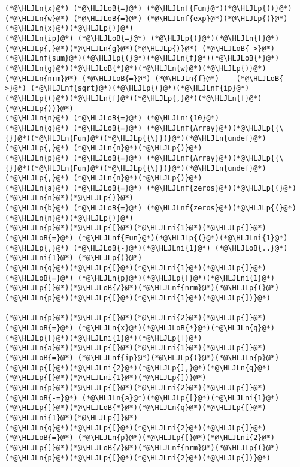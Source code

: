 \documentclass[12pt,landscape]{article}
\newcommand{\HLJLn}[1]{#1}
\newcommand{\HLJLnf}[1]{\textcolor[RGB]{66,102,213}{#1}}
\newcommand{\HLJLni}[1]{\textcolor[RGB]{59,151,46}{#1}}
\newcommand{\HLJLoB}[1]{\textcolor[RGB]{102,102,102}{\textbf{#1}}}
\newcommand{\HLJLp}[1]{#1}
\begin{document}
{\begin{lstlisting}
(*@\HLJLn{x}@*) (*@\HLJLoB{=}@*) (*@\HLJLnf{Fun}@*)(*@\HLJLp{()}@*)
(*@\HLJLn{w}@*) (*@\HLJLoB{=}@*) (*@\HLJLnf{exp}@*)(*@\HLJLp{(}@*)(*@\HLJLn{x}@*)(*@\HLJLp{)}@*)
(*@\HLJLn{ip}@*) (*@\HLJLoB{=}@*) (*@\HLJLp{(}@*)(*@\HLJLn{f}@*)(*@\HLJLp{,}@*)(*@\HLJLn{g}@*)(*@\HLJLp{)}@*) (*@\HLJLoB{->}@*) (*@\HLJLnf{sum}@*)(*@\HLJLp{(}@*)(*@\HLJLn{f}@*)(*@\HLJLoB{*}@*)(*@\HLJLn{g}@*)(*@\HLJLoB{*}@*)(*@\HLJLn{w}@*)(*@\HLJLp{)}@*)
(*@\HLJLn{nrm}@*) (*@\HLJLoB{=}@*) (*@\HLJLn{f}@*)    (*@\HLJLoB{->}@*) (*@\HLJLnf{sqrt}@*)(*@\HLJLp{(}@*)(*@\HLJLnf{ip}@*)(*@\HLJLp{(}@*)(*@\HLJLn{f}@*)(*@\HLJLp{,}@*)(*@\HLJLn{f}@*)(*@\HLJLp{))}@*)
(*@\HLJLn{n}@*) (*@\HLJLoB{=}@*) (*@\HLJLni{10}@*)
(*@\HLJLn{q}@*) (*@\HLJLoB{=}@*) (*@\HLJLnf{Array}@*)(*@\HLJLp{{\{}}@*)(*@\HLJLn{Fun}@*)(*@\HLJLp{{\}}(}@*)(*@\HLJLn{undef}@*)(*@\HLJLp{,}@*) (*@\HLJLn{n}@*)(*@\HLJLp{)}@*)
(*@\HLJLn{p}@*) (*@\HLJLoB{=}@*) (*@\HLJLnf{Array}@*)(*@\HLJLp{{\{}}@*)(*@\HLJLn{Fun}@*)(*@\HLJLp{{\}}(}@*)(*@\HLJLn{undef}@*)(*@\HLJLp{,}@*) (*@\HLJLn{n}@*)(*@\HLJLp{)}@*)
(*@\HLJLn{a}@*) (*@\HLJLoB{=}@*) (*@\HLJLnf{zeros}@*)(*@\HLJLp{(}@*)(*@\HLJLn{n}@*)(*@\HLJLp{)}@*)
(*@\HLJLn{b}@*) (*@\HLJLoB{=}@*) (*@\HLJLnf{zeros}@*)(*@\HLJLp{(}@*)(*@\HLJLn{n}@*)(*@\HLJLp{)}@*)
(*@\HLJLn{p}@*)(*@\HLJLp{[}@*)(*@\HLJLni{1}@*)(*@\HLJLp{]}@*) (*@\HLJLoB{=}@*) (*@\HLJLnf{Fun}@*)(*@\HLJLp{(}@*)(*@\HLJLni{1}@*)(*@\HLJLp{,}@*) (*@\HLJLoB{-}@*)(*@\HLJLni{1}@*) (*@\HLJLoB{..}@*) (*@\HLJLni{1}@*) (*@\HLJLp{)}@*)
(*@\HLJLn{q}@*)(*@\HLJLp{[}@*)(*@\HLJLni{1}@*)(*@\HLJLp{]}@*) (*@\HLJLoB{=}@*) (*@\HLJLn{p}@*)(*@\HLJLp{[}@*)(*@\HLJLni{1}@*)(*@\HLJLp{]}@*)(*@\HLJLoB{/}@*)(*@\HLJLnf{nrm}@*)(*@\HLJLp{(}@*)(*@\HLJLn{p}@*)(*@\HLJLp{[}@*)(*@\HLJLni{1}@*)(*@\HLJLp{])}@*)

(*@\HLJLn{p}@*)(*@\HLJLp{[}@*)(*@\HLJLni{2}@*)(*@\HLJLp{]}@*) (*@\HLJLoB{=}@*) (*@\HLJLn{x}@*)(*@\HLJLoB{*}@*)(*@\HLJLn{q}@*)(*@\HLJLp{[}@*)(*@\HLJLni{1}@*)(*@\HLJLp{]}@*)
(*@\HLJLn{a}@*)(*@\HLJLp{[}@*)(*@\HLJLni{1}@*)(*@\HLJLp{]}@*) (*@\HLJLoB{=}@*) (*@\HLJLnf{ip}@*)(*@\HLJLp{(}@*)(*@\HLJLn{p}@*)(*@\HLJLp{[}@*)(*@\HLJLni{2}@*)(*@\HLJLp{],}@*)(*@\HLJLn{q}@*)(*@\HLJLp{[}@*)(*@\HLJLni{1}@*)(*@\HLJLp{])}@*)
(*@\HLJLn{p}@*)(*@\HLJLp{[}@*)(*@\HLJLni{2}@*)(*@\HLJLp{]}@*) (*@\HLJLoB{-=}@*) (*@\HLJLn{a}@*)(*@\HLJLp{[}@*)(*@\HLJLni{1}@*)(*@\HLJLp{]}@*)(*@\HLJLoB{*}@*)(*@\HLJLn{q}@*)(*@\HLJLp{[}@*)(*@\HLJLni{1}@*)(*@\HLJLp{]}@*)
(*@\HLJLn{q}@*)(*@\HLJLp{[}@*)(*@\HLJLni{2}@*)(*@\HLJLp{]}@*) (*@\HLJLoB{=}@*) (*@\HLJLn{p}@*)(*@\HLJLp{[}@*)(*@\HLJLni{2}@*)(*@\HLJLp{]}@*)(*@\HLJLoB{/}@*)(*@\HLJLnf{nrm}@*)(*@\HLJLp{(}@*)(*@\HLJLn{p}@*)(*@\HLJLp{[}@*)(*@\HLJLni{2}@*)(*@\HLJLp{])}@*)


\end{lstlisting}}
\end{document}
